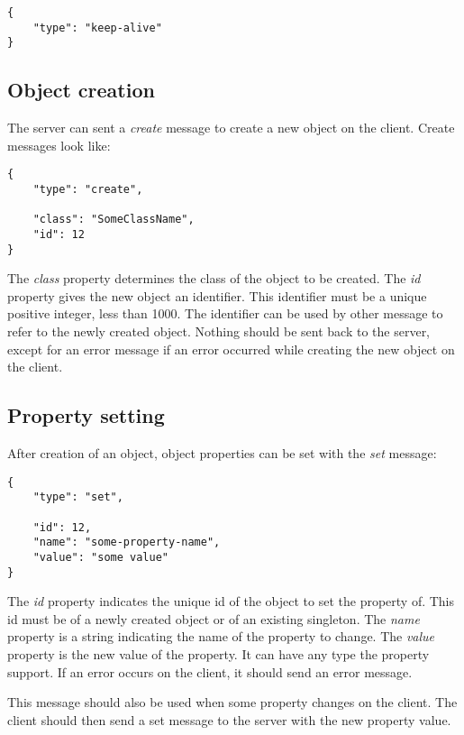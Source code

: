 \documentclass[11pt,a4paper]{article}
\begin{document}
\begin{verbatim}
{
    "type": "keep-alive"
}
\end{verbatim}

\subsection{Object creation}

The server can sent a \textit{create} message to create a new object on the client.
Create messages look like:

\begin{verbatim}
{
    "type": "create",
    
    "class": "SomeClassName",
    "id": 12
}
\end{verbatim}

The \textit{class} property determines the class of the object to be created.
The \textit{id} property gives the new object an identifier.
This identifier must be a unique positive integer, less than 1000.
The identifier can be used by other message to refer to the newly created object.
Nothing should be sent back to the server, except for an error message if an error occurred while creating the new object on the client.

\subsection{Property setting}

After creation of an object, object properties can be set with the \textit{set} message:

\begin{verbatim}
{
    "type": "set",
    
    "id": 12,
    "name": "some-property-name",
    "value": "some value"
}
\end{verbatim}

The \textit{id} property indicates the unique id of the object to set the property of.
This id must be of a newly created object or of an existing singleton.
The \textit{name} property is a string indicating the name of the property to change.
The \textit{value} property is the new value of the property.
It can have any type the property support.
If an error occurs on the client, it should send an error message.

This message should also be used when some property changes on the client.
The client should then send a set message to the server with the new property value.
\end{document}
